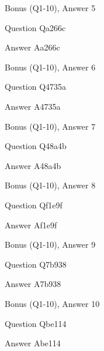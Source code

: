 \documentclass[11pt]{beamer}
\begin{document}
\begin{frame}[t]{Bonus (Q1-10), Answer 5}
\vspace{2em}
\begin{block}{Question}
Qa266c
\end{block}
\pause{}
\begin{block}{Answer}
Aa266c
\end{block}
\end{frame}
    

\begin{frame}[t]{Bonus (Q1-10), Answer 6}
\vspace{2em}
\begin{block}{Question}
Q4735a
\end{block}
\pause{}
\begin{block}{Answer}
A4735a
\end{block}
\end{frame}
    

\begin{frame}[t]{Bonus (Q1-10), Answer 7}
\vspace{2em}
\begin{block}{Question}
Q48a4b
\end{block}
\pause{}
\begin{block}{Answer}
A48a4b
\end{block}
\end{frame}
    

\begin{frame}[t]{Bonus (Q1-10), Answer 8}
\vspace{2em}
\begin{block}{Question}
Qf1e9f
\end{block}
\pause{}
\begin{block}{Answer}
Af1e9f
\end{block}
\end{frame}
    

\begin{frame}[t]{Bonus (Q1-10), Answer 9}
\vspace{2em}
\begin{block}{Question}
Q7b938
\end{block}
\pause{}
\begin{block}{Answer}
A7b938
\end{block}
\end{frame}
    

\begin{frame}[t]{Bonus (Q1-10), Answer 10}
\vspace{2em}
\begin{block}{Question}
Qbe114
\end{block}
\pause{}
\begin{block}{Answer}
Abe114
\end{block}
\end{frame}
    
\end{document}
